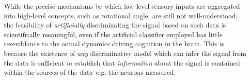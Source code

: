


While the precise mechanisms by which low-level sensory inputs are
aggregated into high-level concepts, such as rotational angle, are
still not well-understood, the feasibility of \emph{artificially}
discriminating the signal based on such data is scientifically
meaningful, even if the artificial classifier employed has little
resemblance to the actual dynamics driving cognition in the brain.  %
This is because the existence of
\emph{any} discriminative model which can infer the signal from the
data is sufficient to establish that \emph{information} about the
signal is contained within the sources of the data--e.g. the neurons
measured.

